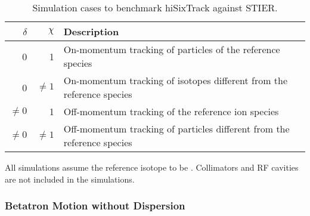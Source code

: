 \begin{table}[b]
\centering
\caption{Simulation cases to benchmark hiSixTrack against STIER.}
\label{tab:simucases}

\begin{tabular}{rrl}
\toprule 
$\delta$ & $\chi$   & Description                                                                            \\ \midrule
0        & 1        & On-momentum tracking of particles of the reference species               \\
0        & $\neq 1$ & On-momentum tracking of isotopes different from the reference species  \\
$\neq 0$ & 1        & Off-momentum tracking of the reference ion species                                     \\
$\neq 0$ & $\neq 1$ & Off-momentum tracking of particles different from the reference species                   \\ \bottomrule
\end{tabular}
\end{table}



All simulations assume the reference isotope to be \lead. Collimators and RF cavities are not included in the simulations.

\subsubsection{Betatron Motion without Dispersion}




